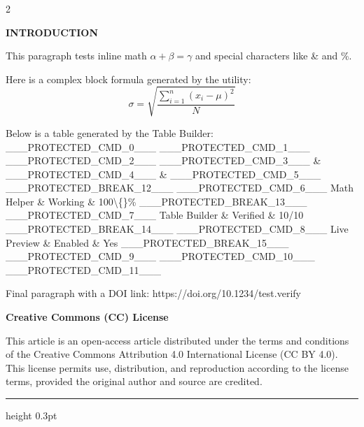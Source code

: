 \documentclass[12pt,a4paper]{article}
\begin{document}
\setlength{\columnsep}{20pt}
\begin{multicols}{2}
\fontsize{9}{11}\selectfont

\vspace{8pt}
\noindent
\textcolor{journalblue}{\textbf{INTRODUCTION}}

\noindent
This paragraph tests inline math $ \alpha + \beta = \gamma $ and special characters like \& and \%.

Here is a complex block formula generated by the utility:
$$ \sigma = \sqrt{\frac{\sum_{i=1}^{n} (x_i - \mu)^2}{N}} $$

Below is a table generated by the Table Builder:
\_\_\_PROTECTED\_CMD\_0\_\_\_
\_\_\_PROTECTED\_CMD\_1\_\_\_
\_\_\_PROTECTED\_CMD\_2\_\_\_
\_\_\_PROTECTED\_CMD\_3\_\_\_ \& \_\_\_PROTECTED\_CMD\_4\_\_\_ \& \_\_\_PROTECTED\_CMD\_5\_\_\_ \_\_\_PROTECTED\_BREAK\_12\_\_\_
\_\_\_PROTECTED\_CMD\_6\_\_\_
Math Helper \& Working \& 100\textbackslash\{\}\% \_\_\_PROTECTED\_BREAK\_13\_\_\_
\_\_\_PROTECTED\_CMD\_7\_\_\_
Table Builder \& Verified \& 10/10 \_\_\_PROTECTED\_BREAK\_14\_\_\_
\_\_\_PROTECTED\_CMD\_8\_\_\_
Live Preview \& Enabled \& Yes \_\_\_PROTECTED\_BREAK\_15\_\_\_
\_\_\_PROTECTED\_CMD\_9\_\_\_
\_\_\_PROTECTED\_CMD\_10\_\_\_
\_\_\_PROTECTED\_CMD\_11\_\_\_

Final paragraph with a DOI link: https://doi.org/10.1234/test.verify



\noindent
\begin{tcolorbox}[
    colback=white,
    colframe=black!60,
    boxrule=0.5pt,
    arc=0pt,
    left=2pt,
    right=2pt,
    top=2pt,
    bottom=2pt,
    boxsep=0pt,
]

\noindent
\colorbox{black!10}{
\parbox{\dimexpr\linewidth-2\fboxsep}{
\centering
\vspace{2pt}
\textbf{Creative Commons (CC) License}
\vspace{2pt}
}}

\fontsize{7}{9}\selectfont This article is an open-access article distributed under the terms and conditions of the Creative Commons Attribution 4.0 International License (CC BY 4.0). This license permits use, distribution, and reproduction according to the license terms, provided the original author and source are credited.

\vspace{2pt}
{\color{black!40}\hrule height 0.3pt}
\vspace{2pt}


\end{tcolorbox}
\end{multicols}
\end{document}
